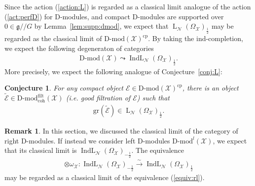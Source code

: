 \documentclass [11pt,oneside,a4paper,mathscr]{amsart}
\newtheorem{conj}[thm]{Conjecture}
\theoremstyle{definition}
\newtheorem{remark}[thm]{Remark}
\newcommand{\LL}{\operatorname{L}}
\newcommand{\X}{\mathcal{X}}
\newcommand{\fg}{\mathfrak{g}}
\newcommand{\IndL}{\operatorname{IndL}}
\newcommand{\ssslash}{/\!\!/}
\begin{document}
Since the action (\ref{action:L}) is regarded as a classical limit analogue of the
action (\ref{act:perfD}) for D-modules, and compact D-modules
are supported over $0\in \fg\ssslash G$ by Lemma~\ref{lem:supp:dmod},
we expect that $\LL_{\mathcal{N}}(\Omega_{\X})_{\frac{1}{2}}$ may be regarded as the classical 
limit of $\text{D-mod}(\X)^{\mathrm{cp}}$. 
By taking the ind-completion, we expect the following degeneraton of categories 
\begin{align*}
    \text{D-mod}(\X)  \leadsto \IndL_{\mathcal{N}}(\Omega_{\X})_{\frac{1}{2}}.
\end{align*}
More precisely, we 
expect the following analogue of Conjecture~\ref{conj:L}:
\begin{conj}\label{conj:limitLN}
For any compact object 
$\mathcal{E} \in \mathrm{D}\text{-}\mathrm{mod}(\mathcal{X})^{\mathrm{cp}}$, there is 
an object $\widetilde{\mathcal{E}} \in \mathrm{D}\text{-}\mathrm{mod}^{\mathrm{filt}}_{\mathrm{coh}}(\mathcal{X})$
(i.e. good filtration of $\mathcal{E}$) such that 
\begin{align*}
    \mathrm{gr}(\widetilde{\mathcal{E}}) \in \LL_{\mathcal{N}}(\Omega_{\mathcal{X}})_{\frac{1}{2}}. 
\end{align*}
    \end{conj}

\begin{remark}\label{rmk:left}
In this section, we discussed the classical limit of the category of right D-modules. 
If instead we consider left D-modules $\text{D-mod}^l(\X)$, we expect 
that its classical limit is $\IndL_{\mathcal{N}}(\Omega_{\X})_{-\frac{1}{2}}$. 
The equivalence 
\begin{align*}
\otimes \omega_{\X} \colon 
    \IndL_{\mathcal{N}}(\Omega_{\X})_{-\frac{1}{2}}\stackrel{\sim}{\to}\IndL_{\mathcal{N}}(\Omega_{\X})_{\frac{1}{2}}
\end{align*}
may be regarded as a classical limit of the equivalence (\ref{equiv:rl}). 
\end{remark}
\end{document}
